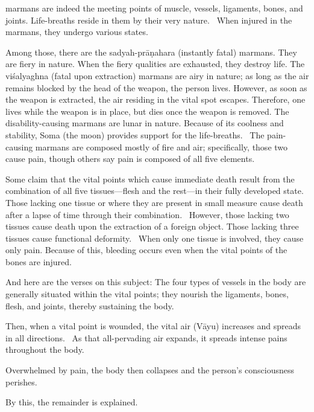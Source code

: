 \begin{translation}
\begin{tt}
\item[15]
marmans are indeed the meeting points of muscle, vessels, ligaments, bones, and joints.
Life-breaths reside in them by their very nature.  When injured in the marmans, they undergo various states.


\item[16]
Among those, there are the sadyah-prāṇahara (instantly fatal) marmans.
They are fiery in nature.
When the fiery qualities are exhausted, they destroy life.
The viśalyaghna (fatal upon extraction) marmans are airy in nature; as long as the air remains blocked by the head of the weapon, the person lives.
However, as soon as the weapon is extracted, the air residing in the vital spot escapes.
Therefore, one lives while the weapon is in place, but dies once the weapon is removed.
The disability-causing marmans are lunar in nature.
Because of its coolness and stability, Soma (the moon) provides support for the life-breaths. 
The pain-causing marmans are composed mostly of fire and air; specifically, those two cause pain, though others say pain is composed of all five elements.


\item[17]
Some claim that the vital points which cause immediate death result from the combination of all five tissues—flesh and the rest—in their fully developed state. 
Those lacking one tissue or where they are present in small measure cause death after a lapse of time through their combination. 
However, those lacking two tissues cause death upon the extraction of a foreign object.
Those lacking three tissues cause functional deformity. 
When only one tissue is involved, they cause only pain.
Because of this, bleeding occurs even when the vital points of the bones are injured.


\item[18]
And here are the verses on this subject:
The four types of vessels in the body are generally situated within the vital points; they nourish the ligaments, bones, flesh, and joints, thereby sustaining the body.


\item[19]
Then, when a vital point is wounded, the vital air (Vāyu) increases and spreads in all directions. 
As that all-pervading air expands, it spreads intense pains throughout the body. 

\item[20]
Overwhelmed by pain, the body then collapses and the person's consciousness perishes.

\item[21]
By this, the remainder is explained.


\end{tt}
\end{translation}
